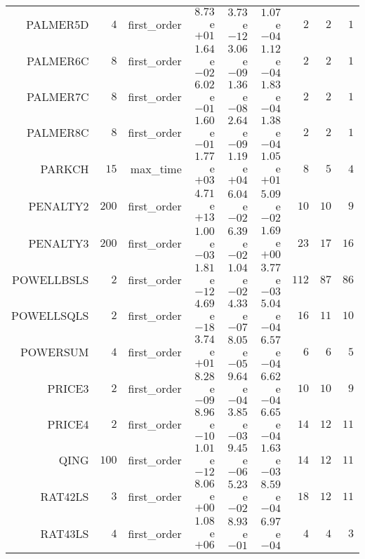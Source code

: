 \begin{longtable}{rrrrrrrrr}
PALMER5D & \(     4\) & first\_order & \( 8.73\)e\(+01\) & \( 3.73\)e\(-12\) & \( 1.07\)e\(-04\) & \(     2\) & \(     2\) & \(     1\) \\
PALMER6C & \(     8\) & first\_order & \( 1.64\)e\(-02\) & \( 3.06\)e\(-09\) & \( 1.12\)e\(-04\) & \(     2\) & \(     2\) & \(     1\) \\
PALMER7C & \(     8\) & first\_order & \( 6.02\)e\(-01\) & \( 1.36\)e\(-08\) & \( 1.83\)e\(-04\) & \(     2\) & \(     2\) & \(     1\) \\
PALMER8C & \(     8\) & first\_order & \( 1.60\)e\(-01\) & \( 2.64\)e\(-09\) & \( 1.38\)e\(-04\) & \(     2\) & \(     2\) & \(     1\) \\
PARKCH & \(    15\) & max\_time & \( 1.77\)e\(+03\) & \( 1.19\)e\(+04\) & \( 1.05\)e\(+01\) & \(     8\) & \(     5\) & \(     4\) \\
PENALTY2 & \(   200\) & first\_order & \( 4.71\)e\(+13\) & \( 6.04\)e\(-02\) & \( 5.09\)e\(-02\) & \(    10\) & \(    10\) & \(     9\) \\
PENALTY3 & \(   200\) & first\_order & \( 1.00\)e\(-03\) & \( 6.39\)e\(-02\) & \( 1.69\)e\(+00\) & \(    23\) & \(    17\) & \(    16\) \\
POWELLBSLS & \(     2\) & first\_order & \( 1.81\)e\(-12\) & \( 1.04\)e\(-02\) & \( 3.77\)e\(-03\) & \(   112\) & \(    87\) & \(    86\) \\
POWELLSQLS & \(     2\) & first\_order & \( 4.69\)e\(-18\) & \( 4.33\)e\(-07\) & \( 5.04\)e\(-04\) & \(    16\) & \(    11\) & \(    10\) \\
POWERSUM & \(     4\) & first\_order & \( 3.74\)e\(+01\) & \( 8.05\)e\(-05\) & \( 6.57\)e\(-04\) & \(     6\) & \(     6\) & \(     5\) \\
PRICE3 & \(     2\) & first\_order & \( 8.28\)e\(-09\) & \( 9.64\)e\(-04\) & \( 6.62\)e\(-04\) & \(    10\) & \(    10\) & \(     9\) \\
PRICE4 & \(     2\) & first\_order & \( 8.96\)e\(-10\) & \( 3.85\)e\(-03\) & \( 6.65\)e\(-04\) & \(    14\) & \(    12\) & \(    11\) \\
QING & \(   100\) & first\_order & \( 1.01\)e\(-12\) & \( 9.45\)e\(-06\) & \( 1.63\)e\(-03\) & \(    14\) & \(    12\) & \(    11\) \\
RAT42LS & \(     3\) & first\_order & \( 8.06\)e\(+00\) & \( 5.23\)e\(-02\) & \( 8.59\)e\(-04\) & \(    18\) & \(    12\) & \(    11\) \\
RAT43LS & \(     4\) & first\_order & \( 1.08\)e\(+06\) & \( 8.93\)e\(-01\) & \( 6.97\)e\(-04\) & \(     4\) & \(     4\) & \(     3\) \\

\end{longtable}
